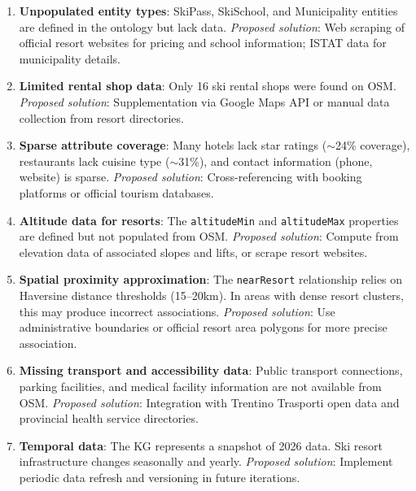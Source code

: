 \begin{enumerate}
    \item \textbf{Unpopulated entity types}: SkiPass, SkiSchool, and Municipality entities are defined in the ontology but lack data. \textit{Proposed solution}: Web scraping of official resort websites for pricing and school information; ISTAT data for municipality details.

    \item \textbf{Limited rental shop data}: Only 16 ski rental shops were found on OSM. \textit{Proposed solution}: Supplementation via Google Maps API or manual data collection from resort directories.

    \item \textbf{Sparse attribute coverage}: Many hotels lack star ratings ($\sim$24\% coverage), restaurants lack cuisine type ($\sim$31\%), and contact information (phone, website) is sparse. \textit{Proposed solution}: Cross-referencing with booking platforms or official tourism databases.

    \item \textbf{Altitude data for resorts}: The \texttt{altitudeMin} and \texttt{altitudeMax} properties are defined but not populated from OSM. \textit{Proposed solution}: Compute from elevation data of associated slopes and lifts, or scrape resort websites.

    \item \textbf{Spatial proximity approximation}: The \texttt{nearResort} relationship relies on Haversine distance thresholds (15--20km). In areas with dense resort clusters, this may produce incorrect associations. \textit{Proposed solution}: Use administrative boundaries or official resort area polygons for more precise association.

    \item \textbf{Missing transport and accessibility data}: Public transport connections, parking facilities, and medical facility information are not available from OSM. \textit{Proposed solution}: Integration with Trentino Trasporti open data and provincial health service directories.

    \item \textbf{Temporal data}: The KG represents a snapshot of 2026 data. Ski resort infrastructure changes seasonally and yearly. \textit{Proposed solution}: Implement periodic data refresh and versioning in future iterations.
\end{enumerate}
